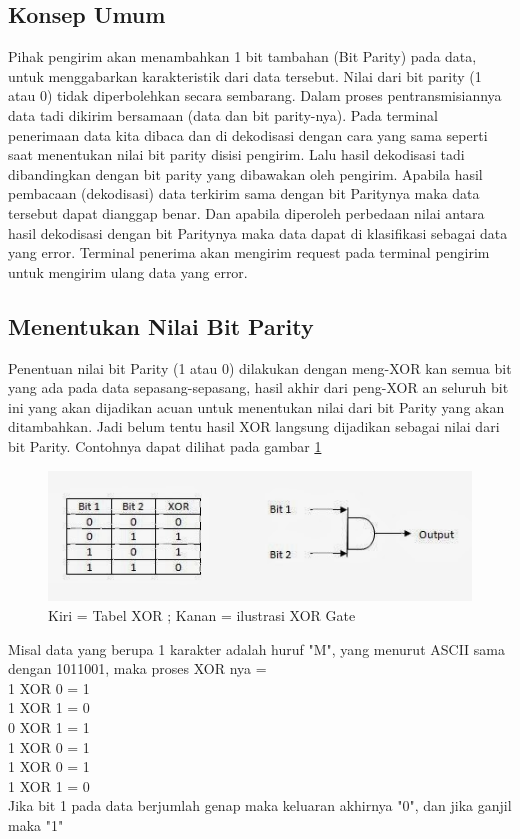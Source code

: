 \subsection{Konsep Umum}
Pihak pengirim akan menambahkan 1 bit tambahan (Bit Parity) pada data, untuk menggabarkan karakteristik dari data tersebut. Nilai dari bit parity (1 atau 0) tidak diperbolehkan secara sembarang. Dalam proses pentransmisiannya data tadi dikirim bersamaan (data dan bit parity-nya). Pada terminal penerimaan data kita dibaca dan di dekodisasi dengan cara yang sama seperti saat menentukan nilai bit parity disisi pengirim. Lalu hasil dekodisasi tadi dibandingkan dengan bit parity yang dibawakan oleh pengirim.
Apabila hasil pembacaan (dekodisasi) data terkirim sama dengan bit Paritynya maka data tersebut dapat dianggap benar. Dan apabila diperoleh perbedaan nilai antara hasil dekodisasi dengan bit Paritynya maka data dapat di klasifikasi sebagai data yang error. Terminal penerima akan mengirim request pada terminal pengirim untuk mengirim ulang data yang error.
 
\subsection{Menentukan Nilai Bit Parity}
Penentuan nilai bit Parity (1 atau 0) dilakukan dengan meng-XOR kan semua bit yang ada pada data sepasang-sepasang, hasil akhir dari peng-XOR an seluruh bit ini yang akan dijadikan acuan untuk menentukan nilai dari bit Parity yang akan ditambahkan. Jadi belum tentu hasil XOR langsung dijadikan sebagai nilai dari bit Parity. Contohnya dapat dilihat pada gambar \ref{ilustrasixorgate}

\begin{figure}[ht]
\centerline{\includegraphics[width=1\textwidth]{figures/ilustrasixorgate.jpg}}
\caption{Kiri = Tabel XOR ; Kanan = ilustrasi XOR Gate}
\label{ilustrasixorgate}
\end{figure}

Misal data yang berupa 1 karakter adalah huruf  "M", yang menurut ASCII sama dengan 1011001, maka proses XOR nya =\\
1 XOR 0 = 1\\
1 XOR 1 = 0\\
0 XOR 1 = 1\\
1 XOR 0 = 1\\
1 XOR 0 = 1\\
1 XOR 1 = 0\\
Jika bit 1 pada data berjumlah genap maka keluaran akhirnya "0", dan jika ganjil maka "1"

